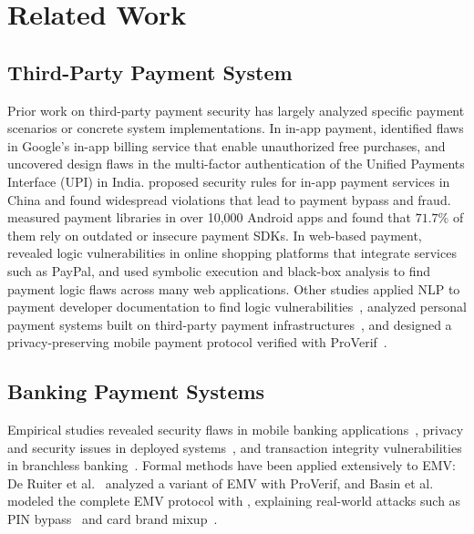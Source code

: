 \section{Related Work}

\subsection{Third-Party Payment System}

Prior work on third-party payment security has largely analyzed specific payment scenarios or concrete system implementations.
In in-app payment, \cite{Reynaud2012FreeMarket, Mulliner2014VirtualSwindle} identified flaws in Google's in-app billing service that enable unauthorized free purchases, and \cite{Kumar2020SecurityUPI} uncovered design flaws in the multi-factor authentication of the Unified Payments Interface (UPI) in India.
\cite{Yang2017FlawedImplementations, Yang2019SecurityPayment} proposed security rules for in-app payment services in China and found widespread violations that lead to payment bypass and fraud.
\cite{Mohsen2025PayScan} measured payment libraries in over 10,000 Android apps and found that $71.7\%$ of them rely on outdated or insecure payment SDKs.
In web-based payment, \cite{Wang2011ShopFree} revealed logic vulnerabilities in online shopping platforms that integrate services such as PayPal, and \cite{Sun2014DetectingECommerce, Pellegrino2014TowardBlackBox, Sudhodanan2016AttackPatterns} used symbolic execution and black-box analysis to find payment logic flaws across many web applications.
Other studies applied NLP to payment developer documentation to find logic vulnerabilities~\cite{Chen2019LogicVulnerabilities}, analyzed personal payment systems built on third-party payment infrastructures~\cite{Lou2021PaymentVulnerabilities}, and designed a privacy-preserving mobile payment protocol verified with ProVerif~\cite{Neera2025TrustworthyPayment}.

\subsection{Banking Payment Systems}

Empirical studies revealed security flaws in mobile banking applications~\cite{Paik2010StragglersHerd}, privacy and security issues in deployed systems~\cite{Almeida2012MPaymentsBrazil,Harris2012PrivacySecurityMobile}, and transaction integrity vulnerabilities in branchless banking~\cite{Reaves2015MobileMoneyProblems,Reaves2017MobileMoneyProblems}.
Formal methods have been applied extensively to EMV: De Ruiter et al.~\cite{Ruiter2011FormalEMV} analyzed a variant of EMV with ProVerif, and Basin et al.~\cite{Basin2021EMVStandard} modeled the complete EMV protocol with \Tamarin, explaining real-world attacks such as PIN bypass~\cite{Basin2023AuthenticationFailures} and card brand mixup~\cite{Basin2021CardBrandMixup}.

